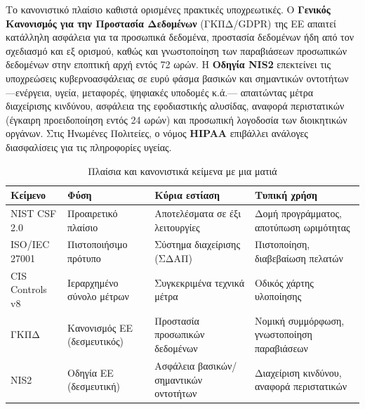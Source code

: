 Το κανονιστικό πλαίσιο καθιστά ορισμένες πρακτικές υποχρεωτικές. Ο \textbf{Γενικός Κανονισμός για την Προστασία Δεδομένων} (ΓΚΠΔ/GDPR) της ΕΕ απαιτεί κατάλληλη ασφάλεια για τα προσωπικά δεδομένα, προστασία δεδομένων ήδη από τον σχεδιασμό και εξ ορισμού, καθώς και γνωστοποίηση των παραβιάσεων προσωπικών δεδομένων στην εποπτική αρχή εντός 72 ωρών. Η \textbf{Οδηγία NIS2} επεκτείνει τις υποχρεώσεις κυβερνοασφάλειας σε ευρύ φάσμα βασικών και σημαντικών οντοτήτων —ενέργεια, υγεία, μεταφορές, ψηφιακές υποδομές κ.ά.— απαιτώντας μέτρα διαχείρισης κινδύνου, ασφάλεια της εφοδιαστικής αλυσίδας, αναφορά περιστατικών (έγκαιρη προειδοποίηση εντός 24 ωρών) και προσωπική λογοδοσία των διοικητικών οργάνων. Στις Ηνωμένες Πολιτείες, ο νόμος \textbf{HIPAA} επιβάλλει ανάλογες διασφαλίσεις για τις πληροφορίες υγείας.

\begin{table}[htbp]
  \centering\small
  \caption{Πλαίσια και κανονιστικά κείμενα με μια ματιά}
  \begin{tabularx}{\linewidth}{>{\raggedright\arraybackslash}X >{\raggedright\arraybackslash}X >{\raggedright\arraybackslash}X >{\raggedright\arraybackslash}X}
    \toprule
    \textbf{Κείμενο} & \textbf{Φύση} & \textbf{Κύρια εστίαση} & \textbf{Τυπική χρήση} \\
    \midrule
    NIST CSF 2.0 & Προαιρετικό πλαίσιο & Αποτελέσματα σε έξι λειτουργίες & Δομή προγράμματος, αποτύπωση ωριμότητας \\
    ISO/IEC 27001 & Πιστοποιήσιμο πρότυπο & Σύστημα διαχείρισης (ΣΔΑΠ) & Πιστοποίηση, διαβεβαίωση πελατών \\
    CIS Controls v8 & Ιεραρχημένο σύνολο μέτρων & Συγκεκριμένα τεχνικά μέτρα & Οδικός χάρτης υλοποίησης \\
    ΓΚΠΔ & Κανονισμός ΕΕ (δεσμευτικός) & Προστασία προσωπικών δεδομένων & Νομική συμμόρφωση, γνωστοποίηση παραβιάσεων \\
    NIS2 & Οδηγία ΕΕ (δεσμευτική) & Ασφάλεια βασικών/σημαντικών οντοτήτων & Διαχείριση κινδύνου, αναφορά περιστατικών \\
    \bottomrule
  \end{tabularx}
\end{table}
